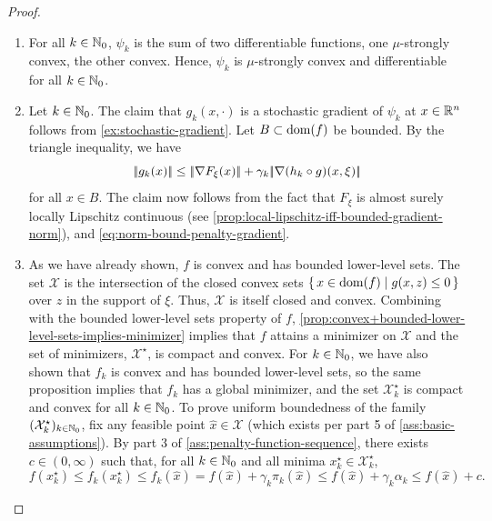 \begin{proof}
\begin{enumerate}
            Finally, the claim follows from
            $\dom(f) = \dom(f_k) \enspace \forall k\in\N_0$.
        \item For all $k\in\mathbb{N}_0$, $\psi_k$ is the sum of two differentiable functions, one $\mu$-strongly convex, the other convex.
            Hence, $\psi_k$ is $\mu$-strongly convex and differentiable for all $k\in\mathbb{N}_0$.
        \item Let $k\in\mathbb{N}_0$. The claim that $g_k(x, \cdot)$ is a stochastic gradient of $\psi_k$ at $x\in\mathbb{R}^n$
        follows from \cref{ex:stochastic-gradient}.
        Let $B\subset \operatorname{dom}(f)$ be bounded. By the triangle inequality, we have
            \[
                |\!|g_k(x)|\!| \leq |\!|\nabla F_\xi(x)|\!| + \gamma_k |\!|\nabla (h_k \circ g)(x, \xi)|\!|
            \]
            for all $x\in B$.
            The claim now follows from the fact that $F_\xi$ is almost surely locally Lipschitz continuous
            (see \cref{prop:local-lipschitz-iff-bounded-gradient-norm}), and \eqref{eq:norm-bound-penalty-gradient}.
        \item As we have already shown, $f$ is convex and has bounded lower-level sets.
            The set $\mathcal{X}$ is the intersection of the closed convex sets
            $\{\, x\in\operatorname{dom}(f) \mid g(x, z) \leq 0 \,\}$ over $z$ in the support of $\xi$.
            Thus, $\mathcal{X}$ is itself closed and convex. Combining with the bounded lower-level sets property
            of $f$,
            \cref{prop:convex+bounded-lower-level-sets-implies-minimizer} implies that $f$
            attains a minimizer on $\mathcal{X}$ and the set of minimizers, $\mathcal{X}^\star$,
            is compact and convex.
            For $k\in\mathbb{N}_0$, we have also shown that
            $f_k$ is convex and has bounded lower-level sets, so the same proposition implies that $f_k$ has a
            global minimizer, and the set $\mathcal{X}_k^\star$ is compact and convex for all $k\in\mathbb{N}_0$.
            To prove uniform boundedness of the family $(\mathcal{X}_k^\star)_{k\in\mathbb{N}_0}$,
            fix any feasible point $\hat{x}\in\mathcal{X}$ (which exists per part 5 of \cref{ass:basic-assumptions}).
            By part 3 of \cref{ass:penalty-function-sequence},
            there exists $c\in(0,\infty)$ such that, for all $k\in\mathbb{N}_0$ and
            all minima $x_k^\star\in\mathcal{X}_k^\star$,
            \[
                f(x_k^\star) \leq f_k(x_k^\star) \leq f_k(\hat{x}) = f(\hat{x}) + \gamma_k\pi_k(\hat{x})
                \leq
                f(\hat{x}) + \gamma_k\alpha_k
                \leq
                f(\hat{x}) + c.
\]
\end{enumerate}
\end{proof}
